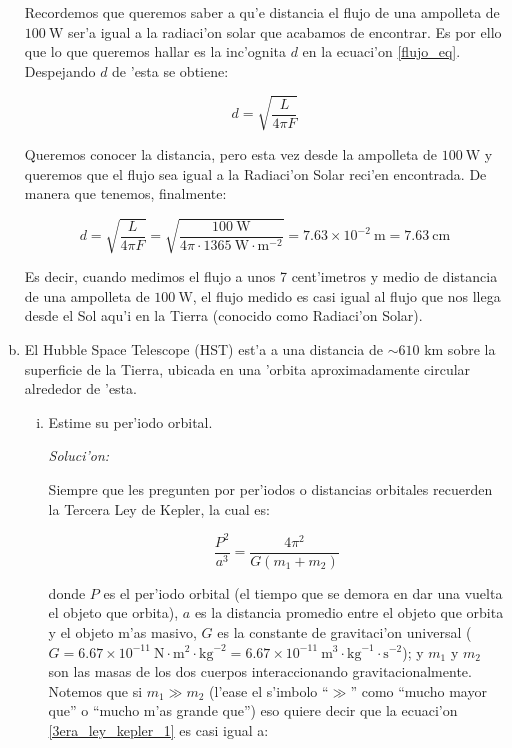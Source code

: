 \documentclass{article}
\newenvironment{myfont}{\fontfamily{pnc}\selectfont}{\par}
\begin{document}
\begin{enumerate}[a)]
Recordemos que queremos saber a qu'e distancia el flujo de una ampolleta de $100 \ \text{W}$ ser'a igual a la radiaci'on solar que acabamos de encontrar. Es por ello que lo que queremos hallar es la inc'ognita $d$ en la ecuaci'on \eqref{flujo_eq}. Despejando $d$ de 'esta se obtiene:

\begin{equation}
d = \sqrt{\frac{L}{4 \pi F}}
\end{equation}

Queremos conocer la distancia, pero esta vez desde la ampolleta de $100 \ \text{W}$ y queremos que el flujo sea igual a la Radiaci'on Solar reci'en encontrada. De manera que tenemos, finalmente:

\begin{equation*}
d = \sqrt{\frac{L}{4 \pi F}} = \sqrt{\frac{100 \ \text{W}}{4 \pi \cdot  1365 \ \text{W} \cdot \text{m}^{-2}}} = 7.63 \times 10^{-2} \ \text{m} = 7.63 \ \text{cm}
\end{equation*}

Es decir, cuando medimos el flujo a unos 7 cent'imetros y medio de distancia de una ampolleta de $100 \  \text{W}$, el flujo medido es casi igual al flujo que nos llega desde el Sol aqu'i en la Tierra (conocido como Radiaci'on Solar).

\begin{myfont} \item El Hubble Space Telescope (HST) est'a a una distancia de $\sim 610$ km sobre la superficie de la Tierra, ubicada en una 'orbita aproximadamente circular alrededor de 'esta. \end{myfont}




\begin{enumerate}[i)]
\begin{myfont}
\item Estime su per'iodo orbital.
\end{myfont}

\emph{Soluci'on:}

Siempre que les pregunten por per'iodos o distancias orbitales recuerden la Tercera Ley de Kepler, la cual es:

\begin{equation} \label{3era_ley_kepler_1}
\frac{P^2}{a^3} = \frac{4 \pi^2}{G (m_1 + m_2)} 
\end{equation}

donde $P$ es el per'iodo orbital (el tiempo que se demora en dar una vuelta el objeto que orbita), $a$ es la distancia promedio entre el objeto que orbita y el objeto m'as masivo, $G$ es la constante de gravitaci'on universal ($G = 6.67 \times 10^{-11} \ \text{N}\cdot \text{m}^2 \cdot \text{kg}^{-2} = 6.67 \times 10^{-11} \ \text{m}^3 \cdot \text{kg}^{-1} \cdot \text{s}^{-2}$); y $m_1$ y $m_2$ son las masas de los dos cuerpos interaccionando gravitacionalmente. Notemos que si $m_1 \gg m_2$ (l'ease el s'imbolo ``$\gg$'' como ``mucho mayor que'' o ``mucho m'as grande que'') eso quiere decir que la ecuaci'on \eqref{3era_ley_kepler_1} es casi igual a:


\end{enumerate}
\end{enumerate}
\end{document}
